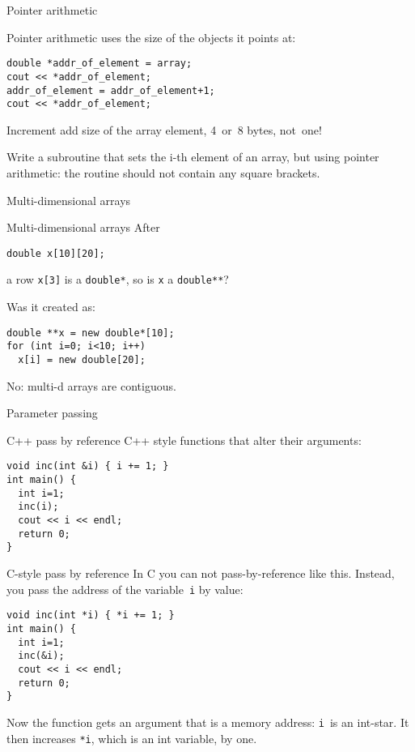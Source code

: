  {Pointer arithmetic}

\begin{block}{Pointer arithmetic}
   uses the size of the objects it
  points at:
\begin{lstlisting}
double *addr_of_element = array;
cout << *addr_of_element;
addr_of_element = addr_of_element+1;
cout << *addr_of_element;
\end{lstlisting}
Increment add size of the array element, 4~or~8 bytes, not~one!
\end{block}

\begin{exercise}
  Write a subroutine that sets the i-th element of an array, but using
  pointer arithmetic: the routine should not contain any square brackets.
\end{exercise}

 {Multi-dimensional arrays}

\begin{block}{Multi-dimensional arrays}
  \label{sl:static-multi}
After
\begin{lstlisting}
double x[10][20];
\end{lstlisting}
a row \lstinline{x[3]} is a \lstinline{double*}, so is \lstinline{x} a \lstinline{double**}?

Was it created as:
\begin{lstlisting}
double **x = new double*[10];
for (int i=0; i<10; i++)
  x[i] = new double[20];
\end{lstlisting}
No: multi-d arrays are contiguous.
\end{block}

 {Parameter passing}

\begin{block}{C++ pass by reference}
  \label{sl:cpp-pass-ref}
  C++ style functions that alter their arguments:
\begin{lstlisting}
void inc(int &i) { i += 1; }
int main() {
  int i=1;
  inc(i);
  cout << i << endl;
  return 0;
}
\end{lstlisting}
\end{block}

\begin{block}{C-style pass by reference}
  \label{sl:c-pass-ref}
  In C you can not pass-by-reference like this. Instead, you pass the
  address of the variable~\lstinline{i} by value:
\begin{lstlisting}
void inc(int *i) { *i += 1; }
int main() {
  int i=1;
  inc(&i);
  cout << i << endl;
  return 0;
}
\end{lstlisting}
Now the function gets an argument that is a memory address: \lstinline{i}~is
an int-star. It then increases \lstinline{*i}, which is an int variable, by one.
\end{block}

